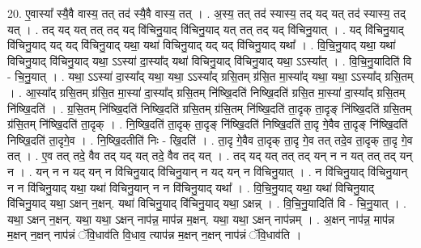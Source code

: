 \documentclass[17pt]{extarticle}
\begin{document}
20. ए॒वास्या᳚ स्यै॒वै वास्य॒ तत् तद॑ स्यै॒वै वास्य॒ तत् । . अ॒स्य॒ तत् तद॑ स्यास्य॒ तद् यद् यत् तद॑ स्यास्य॒ तद् यत् । . तद् यद् यत् तत् तद् यद् वि॑चिनु॒याद् वि॑चिनु॒याद् यत् तत् तद् यद् वि॑चिनु॒यात् । . यद् वि॑चिनु॒याद् वि॑चिनु॒याद् यद् यद् वि॑चिनु॒याद् यथा॒ यथा॑ विचिनु॒याद् यद् यद् वि॑चिनु॒याद् यथा᳚ । . वि॒चि॒नु॒याद् यथा॒ यथा॑ विचिनु॒याद् वि॑चिनु॒याद् यथा॒ ऽऽस्या॑ दा॒स्या᳚द् यथा॑ विचिनु॒याद् वि॑चिनु॒याद् यथा॒ ऽऽस्या᳚त् । . वि॒चि॒नु॒यादिति॑ वि - चि॒नु॒यात् । . यथा॒ ऽऽस्या॑ दा॒स्या᳚द् यथा॒ यथा॒ ऽऽस्या᳚द् ग्रसि॒तम् ग्र॑सि॒त मा॒स्या᳚द् यथा॒ यथा॒ ऽऽस्या᳚द् ग्रसि॒तम् । . आ॒स्या᳚द् ग्रसि॒तम् ग्र॑सि॒त मा॒स्या॑ दा॒स्या᳚द् ग्रसि॒तम् नि॑ष्खि॒दति॑ निष्खि॒दति॑ ग्रसि॒त मा॒स्या॑ दा॒स्या᳚द् ग्रसि॒तम् नि॑ष्खि॒दति॑ । . ग्र॒सि॒तम् नि॑ष्खि॒दति॑ निष्खि॒दति॑ ग्रसि॒तम् ग्र॑सि॒तम् नि॑ष्खि॒दति॑ ता॒दृक् ता॒दृङ् नि॑ष्खि॒दति॑ ग्रसि॒तम् ग्र॑सि॒तम् नि॑ष्खि॒दति॑ ता॒दृक् । . नि॒ष्खि॒दति॑ ता॒दृक् ता॒दृङ् नि॑ष्खि॒दति॑ निष्खि॒दति॑ ता॒दृ गे॒वैव ता॒दृङ् नि॑ष्खि॒दति॑ निष्खि॒दति॑ ता॒दृगे॒व । . नि॒ष्खि॒दतीति॑ निः - खि॒दति॑ । . ता॒दृ गे॒वैव ता॒दृक् ता॒दृ गे॒व तत् तदे॒व ता॒दृक् ता॒दृ गे॒व तत् । . ए॒व तत् तदे॒ वैव तद् यद् यत् तदे॒ वैव तद् यत् । . तद् यद् यत् तत् तद् यन् न न यत् तत् तद् यन् न । . यन् न न यद् यन् न वि॑चिनु॒याद् वि॑चिनु॒यान् न यद् यन् न वि॑चिनु॒यात् । . न वि॑चिनु॒याद् वि॑चिनु॒यान् न न वि॑चिनु॒याद् यथा॒ यथा॑ विचिनु॒यान् न न वि॑चिनु॒याद् यथा᳚ । . वि॒चि॒नु॒याद् यथा॒ यथा॑ विचिनु॒याद् वि॑चिनु॒याद् यथा॒ ऽक्षन् न॒क्षन्. यथा॑ विचिनु॒याद् वि॑चिनु॒याद् यथा॒ ऽक्षन्न् । . वि॒चि॒नु॒यादिति॑ वि - चि॒नु॒यात् । . यथा॒ ऽक्षन् न॒क्षन्. यथा॒ यथा॒ ऽक्षन् नाप॑न्न॒ माप॑न्न म॒क्षन्. यथा॒ यथा॒ ऽक्षन् नाप॑न्नम् । . अ॒क्षन् नाप॑न्न॒ माप॑न्न म॒क्षन् न॒क्षन् नाप॑न्नं ॅवि॒धाव॑ति वि॒धाव॒ त्याप॑न्न म॒क्षन् न॒क्षन् नाप॑न्नं ॅवि॒धाव॑ति । \newline
\end{document}
